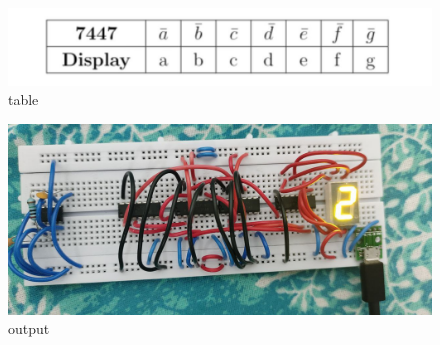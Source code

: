\documentclass[12pt, journal]{IEEEtran}
\begin{document}
	\begin{figure}[ht]
		\includegraphics[width=\linewidth]{img/7447_table.jpg}
		\caption{ table}
		\label{fig-6}
	\end{figure}
	\begin{figure}[ht]
		\includegraphics[width=\linewidth]{img/output.jpeg}
		\caption{output}
		\label{fig-7}
	\end{figure}




	
\end{document}
